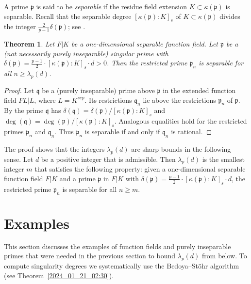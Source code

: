 \documentclass[12pt,reqno]{amsart}%
\newtheorem{thm}[prop]{Theorem}
\theoremstyle{definition}
\theoremstyle{remark}
\newcommand{\su}{\subset}
\newcommand{\pp}{\mathfrak{p}}
\newcommand{\fq}{\mathfrak{q}}
\newcommand{\de}{\delta}
\newcommand{\ka}{\kappa}
\newcommand{\lam}{\lambda}
\begin{document}
A prime $\pp$ is said to be \emph{separable} if the residue field extension $K \su \ka(\pp)$ is separable.
Recall that the separable degree $[\ka(\pp):K]_s$ of $K \su \ka(\pp)$ divides the integer $\frac 2{p-1} \de(\pp)$; see \cite[Corollary~2.16]{HiSt22}.


\begin{thm}\label{2025_05_22_11:15}
Let $F|K$ be a one-dimensional separable function field. Let $\pp$ be a (not necessarily purely inseparable) singular prime with $\de(\pp) = \frac{p-1}2 {\cdot} [\ka(\pp):K]_s {\cdot} d > 0$.
Then the restricted prime $\pp_n$ is separable for all $n \geq \lam_p (d)$.
\end{thm} 

\begin{proof}
Let $\fq$ be a (purely inseparable) prime above $\pp$ in the extended function field $FL|L$, where $L=K^{sep}$.
Its restrictions $\fq_n$ lie above the restrictions $\pp_n$ of $\pp$.
By \cite[Proposition~2.12]{HiSt22} the prime $\fq$ has $\de(\fq) = \de(\pp)/[\ka(\pp):K]_s$ and $\deg(\fq)=\deg(\pp)/[\ka(\pp):K]_s$.
Analogous equalities hold for the restricted primes $\pp_n$ and $\fq_n$. 
Thus $\pp_n$ is separable if and only if $\fq_n$ is rational.
\end{proof}

The proof shows that the integers $\lam_p(d)$ are sharp bounds in the following sense.
Let $d$ be a positive integer that is admissible.
Then $\lam_p(d)$ is the smallest integer $m$ that satisfies the following property: given a one-dimensional separable function field $F|K$ and a prime $\pp$ in $F|K$ with $\de(\pp) = \frac{p-1}2 {\cdot} [\ka(\pp):K]_s {\cdot}d$, the restricted prime $\pp_n$ is separable for all $n \geq m$.

\section{Examples} \label{2024_02_13_22:30}

This section discusses the examples of function fields and purely inseparable primes that were needed in the previous section to bound $\lam_p(d)$ from below.
To compute singularity degrees we systematically use the Bedoya--Stöhr algorithm (see Theorem~\ref{2024_01_21_02:30}).
\end{document}
